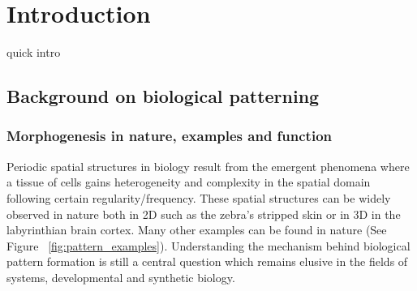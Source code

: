 
\chapter{Introduction}

quick intro
\section{Background on biological patterning}
\subsection{Morphogenesis in nature, examples and function}
Periodic spatial structures in biology result from the emergent phenomena where a tissue of cells gains heterogeneity and complexity in the spatial domain following certain regularity/frequency.
These spatial structures can be widely observed in nature both in 2D such as the zebra's stripped skin or in 3D in the labyrinthian brain cortex.
Many other examples can be found in nature (See Figure ~\ref{fig:pattern_examples}).
Understanding the mechanism behind biological pattern formation is still a central question which remains elusive in the fields of systems, developmental and synthetic biology.  %

